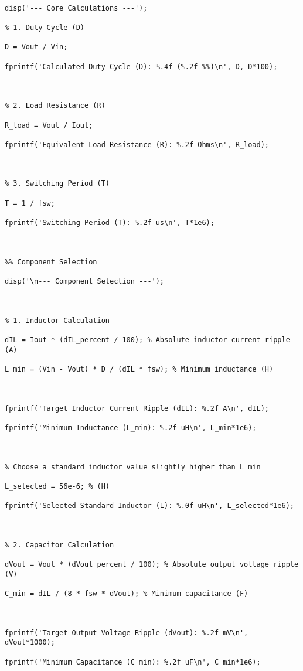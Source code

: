 \documentclass[12pt, a4paper]{article}
\begin{document}
\begin{lstlisting}[caption={MATLAB script for buck converter calculations.}, label={lst:matlab}]
%% Core Calculations

disp('--- Core Calculations ---');

% 1. Duty Cycle (D)

D = Vout / Vin;

fprintf('Calculated Duty Cycle (D): %.4f (%.2f %%)\n', D, D*100);



% 2. Load Resistance (R)

R_load = Vout / Iout;

fprintf('Equivalent Load Resistance (R): %.2f Ohms\n', R_load);



% 3. Switching Period (T)

T = 1 / fsw;

fprintf('Switching Period (T): %.2f us\n', T*1e6);



%% Component Selection

disp('\n--- Component Selection ---');



% 1. Inductor Calculation

dIL = Iout * (dIL_percent / 100); % Absolute inductor current ripple (A)

L_min = (Vin - Vout) * D / (dIL * fsw); % Minimum inductance (H)



fprintf('Target Inductor Current Ripple (dIL): %.2f A\n', dIL);

fprintf('Minimum Inductance (L_min): %.2f uH\n', L_min*1e6);



% Choose a standard inductor value slightly higher than L_min

L_selected = 56e-6; % (H)

fprintf('Selected Standard Inductor (L): %.0f uH\n', L_selected*1e6);



% 2. Capacitor Calculation

dVout = Vout * (dVout_percent / 100); % Absolute output voltage ripple (V)

C_min = dIL / (8 * fsw * dVout); % Minimum capacitance (F)



fprintf('Target Output Voltage Ripple (dVout): %.2f mV\n', dVout*1000);

fprintf('Minimum Capacitance (C_min): %.2f uF\n', C_min*1e6);




\end{lstlisting}
\end{document}
